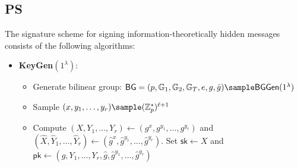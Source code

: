 {%
























% 
% 




\subsection{PS \cite{sako_short_2016}}

The signature scheme for signing information-theoretically hidden messages consists of the following algorithms:

\begin{itemize}
    \item \textbf{KeyGen}$(1^\lambda)$:
        \begin{itemize}
            \item Generate bilinear group: $\mathsf{BG} = (p, \G_1, \G_2, \G_T, e, g, \hat{g}) \sample \mathsf{BGGen}(1^\lambda)$
            \item Sample $(x, y_1, \ldots, y_{r}) \sample (\Z_p^*)^{\ell+1}$
            \item Compute $(X, Y_1, \ldots, Y_r) \gets (g^x, g^{y_1}, \ldots, g^{y_r})$ and $(\hat{X}, \hat{Y}_1, \ldots, \hat{Y}_r) \gets (\hat{g}^x, \hat{g}^{y_1}, \ldots, \hat{g}^{y_r})$. Set $\mathsf{sk} \gets X$ and $\mathsf{pk} \gets (g, Y_1, \ldots, Y_r, \hat{g}, \hat{g}^{y_1}, \ldots, \hat{g}^{y_r})$
        \end{itemize}
    

\end{itemize}}
